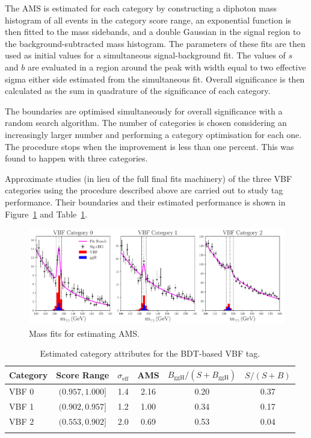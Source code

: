 The $\mathrm{AMS}$ is estimated for each category by constructing a diphoton mass histogram of all events in the category score range, an exponential function is then fitted to the mass sidebands, and a double Gaussian in the signal region to the background-subtracted mass histogram. The parameters of these fits are then used as initial values for a simultaneous signal-background fit. 
The values of $s$ and $b$ are evaluated in a region around the peak with width equal to two effective sigma either side estimated from the simultaneous fit. Overall significance is then calculated as the sum in quadrature of the significance of each category. 

The boundaries are optimised simultaneously for overall significance with a random search algorithm. The number of categories is chosen considering an increasingly larger number and performing a category optimisation for each one. The procedure stops when the improvement is less than one percent. This was found to happen with three categories. 

Approximate studies (in lieu of the full final fits machinery) of the three VBF categories using the procedure described above are carried out to study tag performance. Their boundaries and their estimated performance is shown in Figure~\ref{fig:event_categorisaton:bdt_mass_fits} and Table~\ref{tab:event_selection:legacy_cats}.
\begin{figure}[h!]
    \centering
    \includegraphics[width=1.0\textwidth]{figures/event_selection/BDT_mass_fits.pdf}
    \caption{Mass fits for estimating AMS.}
    \label{fig:event_categorisaton:bdt_mass_fits}
\end{figure}
\begin{table}[h!]
    \centering
    \renewcommand{\arraystretch}{1.3}
    \begin{tabular}{ l | c c c c c }
        \thickhline
        Category & Score Range & $\sigma_{\mathrm{eff}}$ & AMS & $B_{\mathrm{ggH}}/(S+B_{\mathrm{ggH}})$ & $S/(S+B)$ \\
        \hline
        VBF 0 & $(0.957, 1.000]$ & 1.4 &  2.16 & 0.20 & 0.37 \\
        VBF 1 & $(0.902, 0.957]$ & 1.2 &  1.00 & 0.34 & 0.17 \\
        VBF 2 & $(0.553, 0.902]$ & 2.0 &  0.69 & 0.53 & 0.04 \\
        \thickhline
    \end{tabular}
    \caption{Estimated category attributes for the BDT-based VBF tag.}
    \label{tab:event_selection:legacy_cats}
\end{table}






